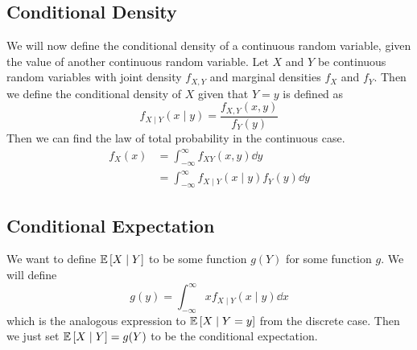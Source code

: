 \subsection{Conditional Density}
We will now define the conditional density of a continuous random variable, given the value of another continuous random variable. Let \(X\) and \(Y\) be continuous random variables with joint density \(f_{X, Y}\) and marginal densities \(f_X\) and \(f_Y\). Then we define the conditional density of \(X\) given that \(Y = y\) is defined as
\[ f_{X \mid Y}(x \mid y) = \frac{f_{X, Y}(x, y)}{f_Y(y)} \]
Then we can find the law of total probability in the continuous case.
\begin{align*}
	f_X(x) & = \int_{-\infty}^\infty f_{XY}(x, y) \dd{y}                 \\
	       & = \int_{-\infty}^\infty f_{X \mid Y}(x \mid y)f_Y(y) \dd{y}
\end{align*}

\subsection{Conditional Expectation}
We want to define \(\mathbb{E}\left[{X \mid Y}\right]\) to be some function \(g(Y)\) for some function \(g\). We will define
\[ g(y) = \int_{-\infty}^\infty xf_{X \mid Y}(x \mid y) \dd{x} \]
which is the analogous expression to \(\mathbb{E}\left[{X \mid Y = y}\right]\) from the discrete case. Then we just set \(\mathbb{E}\left[{X \mid Y}\right] = g(Y)\) to be the conditional expectation.

